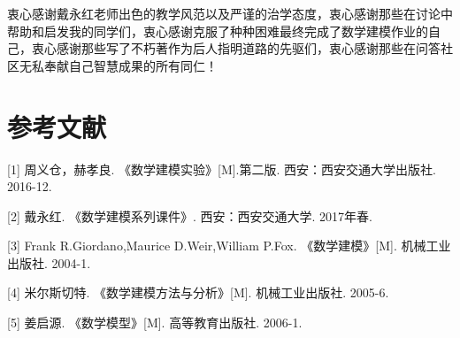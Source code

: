 \documentclass[UTF8]{ctexart}
\begin{document}
    衷心感谢戴永红老师出色的教学风范以及严谨的治学态度，衷心感谢那些在讨论中帮助和启发我的同学们，衷心感谢克服了种种困难最终完成了数学建模作业的自己，衷心感谢那些写了不朽著作为后人指明道路的先驱们，衷心感谢那些在问答社区无私奉献自己智慧成果的所有同仁！

    \section{参考文献}
    [1] 周义仓，赫孝良. 《数学建模实验》[M].第二版. 西安：西安交通大学出版社. 2016-12.

    [2] 戴永红. 《数学建模系列课件》. 西安：西安交通大学. 2017年春.

    [3] Frank R.Giordano,Maurice D.Weir,William P.Fox. 《数学建模》[M]. 机械工业出版社. 2004-1.

    [4] 米尔斯切特. 《数学建模方法与分析》[M]. 机械工业出版社. 2005-6.

    [5] 姜启源. 《数学模型》[M]. 高等教育出版社. 2006-1.

\end{document}
